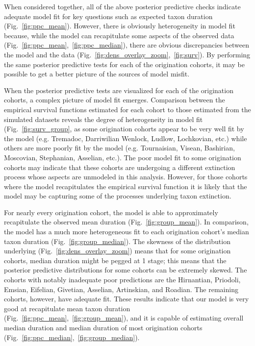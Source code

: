 \documentclass[11pt]{article}
\begin{document}
When considered together, all of the above posterior predictive checks indicate adequate model fit for key questions such as expected taxon duration (Fig.~\ref{fig:ppc_mean}). However, there is obviously heterogeneity in model fit because, while the model can recapitulate some aspects of the observed data (Fig.~\ref{fig:ppc_mean},~\ref{fig:ppc_median}), there are obvious discrepancies between the model and the data (Fig.~\ref{fig:dens_overlay_zoom},~\ref{fig:surv}). By performing the same posterior predictive tests for each of the origination cohorts, it may be possible to get a better picture of the sources of model misfit.

When the posterior predictive tests are visualized for each of the origination cohorts, a complex picture of model fit emerges. Comparison between the empirical survival functions estimated for each cohort to those estimated from the simulated datasets reveals the degree of heterogeneity in model fit (Fig.~\ref{fig:surv_group}, as some origination cohorts appear to be very well fit by the model (e.g. Tremadoc, Darriwilian Wenlock, Ludlow, Lochkovian, etc.) while others are more poorly fit by the model (e.g. Tournaisian, Visean, Bashirian, Moscovian, Stephanian, Asselian, etc.). The poor model fit to some origination cohorts may indicate that these cohorts are undergoing a different extinction process whose aspects are unmodeled in this analysis. However, for those cohorts where the model recapitulates the empirical survival function it is likely that the model may be capturing some of the processes underlying taxon extinction.

For nearly every origination cohort, the model is able to approximately recapitulate the observed mean duration (Fig.~\ref{fig:group_mean}). In comparison, the model has a much more heterogeneous fit to each origination cohort's median taxon duration (Fig.~\ref{fig:group_median}). The skewness of the distribution underlying (Fig.~\ref{fig:dens_overlay_zoom}) means that for some origination cohorts, median duration might be pegged at 1 stage; this means that the posterior predictive distributions for some cohorts can be extremely skewed. The cohorts with notably inadequate poor predictions are the Hirnantian, Priodoli, Emsian, Eifelian, Givetian, Asselian, Artinskian, and Roadian. The remaining cohorts, however, have adequate fit. These results indicate that our model is very good at recapitulate mean taxon duration (Fig.~\ref{fig:ppc_mean},~\ref{fig:group_mean}), and it is capable of estimating overall median duration and median duration of most origination cohorts (Fig.~\ref{fig:ppc_median},~\ref{fig:group_median}).
\end{document}
